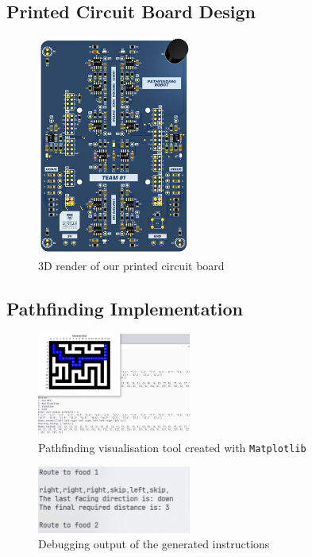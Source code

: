 \documentclass[conference]{IEEEtran}
\begin{document}
\subsection{Printed Circuit Board Design}

\begin{figure}[H]
	\centerline{\includegraphics[width=0.45\textwidth]{pcb.png}}
	\caption{3D render of our printed circuit board}
	\label{fig:pcb}
\end{figure}

\subsection{Pathfinding Implementation}

\begin{figure}[H]
	\centerline{\includegraphics[width=0.45\textwidth]{pathfinding-visualisation.png}}
	\caption{Pathfinding visualisation tool created with \texttt{Matplotlib}}
	\label{fig:pathfinding-visualisation}
\end{figure}
\begin{figure}[H]
	\centerline{\includegraphics[width=0.45\textwidth]{pathfinding-instructions.png}}
	\caption{Debugging output of the generated instructions}
	\label{fig:pathfinding-instructions}
\end{figure}
\end{document}
